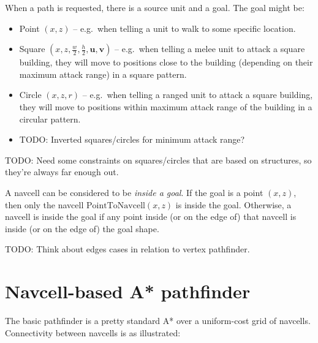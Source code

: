 \documentclass[a4paper,10pt]{article}
\begin{document}
When a path is requested, there is a source unit and a goal.
The goal might be:
\begin{itemize}
 \item Point $(x, z)$ --
 e.g.\ when telling a unit to walk to some specific location.
 \item Square $(x, z, \frac{w}{2}, \frac{h}{2}, \mathbf{u}, \mathbf{v})$ --
 e.g.\ when telling
 a melee unit to attack a square building, they will move to positions close to the building
 (depending on their maximum attack range) in a square pattern.
 \item Circle $(x, z, r)$ --
 e.g.\ when telling
 a ranged unit to attack a square building, they will move to positions within
 maximum attack range of the building in a circular pattern.
 \item TODO: Inverted squares/circles for minimum attack range?
\end{itemize}

TODO: Need some constraints on squares/circles that are based on structures,
so they're always far enough out.

A navcell can be considered to be \emph{inside a goal}.
If the goal is a point $(x, z)$, then only the navcell $\mathrm{PointToNavcell}(x, z)$
is inside the goal.
Otherwise, a navcell is inside the goal if any point inside (or on the edge of) that navcell
is inside (or on the edge of) the goal shape.

TODO: Think about edges cases in relation to vertex pathfinder.

\section{Navcell-based A* pathfinder}

The basic pathfinder is a pretty standard A* over a uniform-cost grid of navcells.
Connectivity between navcells is as illustrated:
\end{document}
